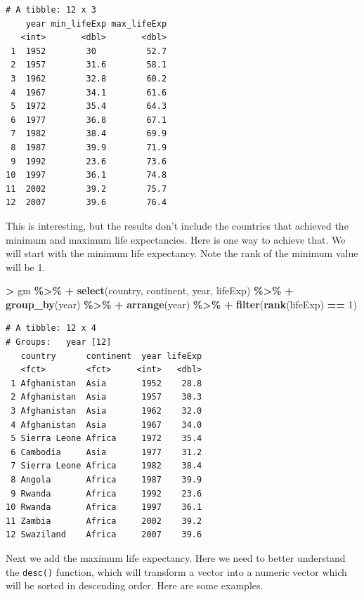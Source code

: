 \documentclass[
]{krantz}
\makeatletter
\newenvironment{Shaded}{\begin{snugshade}}{\end{snugshade}}
\newcommand{\DecValTok}[1]{\textcolor[rgb]{0.06,0.06,0.06}{#1}}
\newcommand{\KeywordTok}[1]{\textcolor[rgb]{0.27,0.27,0.27}{\textbf{#1}}}
\newcommand{\NormalTok}[1]{#1}
\newcommand{\OperatorTok}[1]{\textcolor[rgb]{0.43,0.43,0.43}{\textbf{#1}}}
\newcommand{\StringTok}[1]{\textcolor[rgb]{0.5,0.5,0.5}{#1}}
\newenvironment{kframe}{%
\medskip{}
\setlength{\fboxsep}{.8em}
 \def\at@end@of@kframe{}%
 \ifinner\ifhmode%
  \def\at@end@of@kframe{\end{minipage}}%
  \begin{minipage}{\columnwidth}%
 \fi\fi%
 \def\FrameCommand##1{\hskip\@totalleftmargin \hskip-\fboxsep
 \colorbox{shadecolor}{##1}\hskip-\fboxsep
     \hskip-\linewidth \hskip-\@totalleftmargin \hskip\columnwidth}%
 \MakeFramed {\advance\hsize-\width
   \@totalleftmargin\z@ \linewidth\hsize
   \@setminipage}}%
 {\par\unskip\endMakeFramed%
 \at@end@of@kframe}
\renewenvironment{Shaded}{\begin{kframe}}{\end{kframe}}
\makeatother
\begin{document}
\begin{verbatim}
# A tibble: 12 x 3
    year min_lifeExp max_lifeExp
   <int>       <dbl>       <dbl>
 1  1952        30          52.7
 2  1957        31.6        58.1
 3  1962        32.8        60.2
 4  1967        34.1        61.6
 5  1972        35.4        64.3
 6  1977        36.8        67.1
 7  1982        38.4        69.9
 8  1987        39.9        71.9
 9  1992        23.6        73.6
10  1997        36.1        74.8
11  2002        39.2        75.7
12  2007        39.6        76.4
\end{verbatim}

This is interesting, but the results don't include the countries that achieved the minimum and maximum life expectancies. Here is one way to achieve that. We will start with the minimum life expectancy. Note the rank of the minimum value will be 1.

\begin{Shaded}
\begin{Highlighting}[]
\OperatorTok{\textgreater{}}\StringTok{ }\NormalTok{gm }\OperatorTok{\%\textgreater{}\%}\StringTok{ }
\OperatorTok{+}\StringTok{   }\KeywordTok{select}\NormalTok{(country, continent, year, lifeExp) }\OperatorTok{\%\textgreater{}\%}\StringTok{ }
\OperatorTok{+}\StringTok{   }\KeywordTok{group\_by}\NormalTok{(year) }\OperatorTok{\%\textgreater{}\%}\StringTok{ }
\OperatorTok{+}\StringTok{   }\KeywordTok{arrange}\NormalTok{(year) }\OperatorTok{\%\textgreater{}\%}\StringTok{ }
\OperatorTok{+}\StringTok{   }\KeywordTok{filter}\NormalTok{(}\KeywordTok{rank}\NormalTok{(lifeExp) }\OperatorTok{==}\StringTok{ }\DecValTok{1}\NormalTok{)}
\end{Highlighting}
\end{Shaded}

\begin{verbatim}
# A tibble: 12 x 4
# Groups:   year [12]
   country      continent  year lifeExp
   <fct>        <fct>     <int>   <dbl>
 1 Afghanistan  Asia       1952    28.8
 2 Afghanistan  Asia       1957    30.3
 3 Afghanistan  Asia       1962    32.0
 4 Afghanistan  Asia       1967    34.0
 5 Sierra Leone Africa     1972    35.4
 6 Cambodia     Asia       1977    31.2
 7 Sierra Leone Africa     1982    38.4
 8 Angola       Africa     1987    39.9
 9 Rwanda       Africa     1992    23.6
10 Rwanda       Africa     1997    36.1
11 Zambia       Africa     2002    39.2
12 Swaziland    Africa     2007    39.6
\end{verbatim}

Next we add the maximum life expectancy. Here we need to better understand the \texttt{desc()} function, which will transform a vector into a numeric vector which will be sorted in descending order. Here are some examples.
\end{document}
